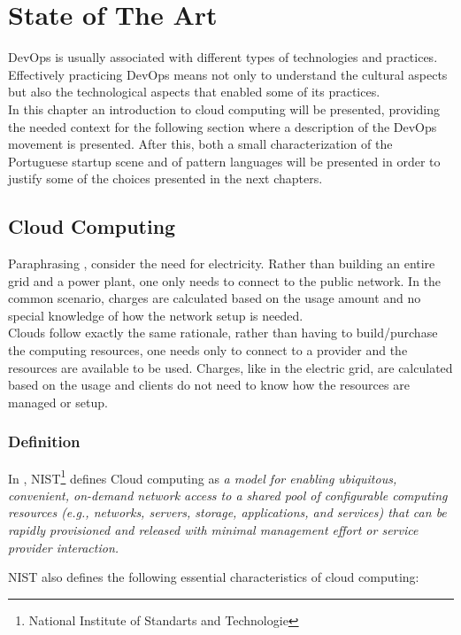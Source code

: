 \chapter{State of The Art} \label{chap:stateoftheart}
DevOps is usually associated with different types of technologies and practices. Effectively practicing DevOps means not only to understand the cultural aspects but also the technological aspects that enabled some of its practices. \\
In this chapter an introduction to cloud computing will be presented, providing the needed context for the following section where a description of the DevOps movement is presented. After this, both a small characterization of the Portuguese startup scene and of pattern languages will be presented in order to justify some of the choices presented in the next chapters.

    \section{Cloud Computing} \label{chap:stateoftheart:sec:cloud}
    Paraphrasing \cite{Bass}, consider the need for electricity. Rather than building an entire grid and a power plant, one only needs to connect to the public network. In the common scenario, charges are calculated based on the usage amount and no special knowledge of how the network setup is needed.\\
    Clouds follow exactly the same rationale, rather than having to build/purchase the computing resources, one needs only to connect to a provider and the resources are available to be used. Charges, like in the electric grid, are calculated based on the usage and clients do not need to know how the resources are managed or setup.
        \subsection{Definition} \label{chap:stateoftheart:sec:cloud:sec:definition}
        In \cite{Mell2011}, NIST\footnote{National Institute of Standarts and Technologie} defines Cloud computing as \textit{a model for enabling ubiquitous, convenient, on-demand network access to a shared pool of configurable computing resources (e.g., networks, servers, storage, applications, and services) that can be rapidly provisioned and released with minimal management effort or service provider interaction.}

        NIST also defines the following essential characteristics of cloud computing:


